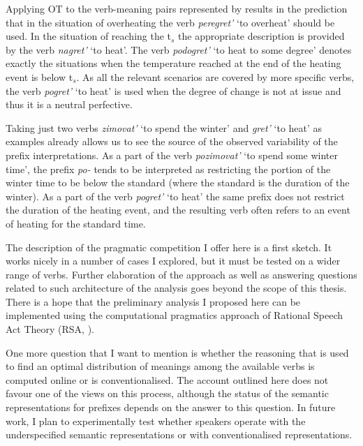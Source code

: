 Applying OT to the verb-meaning pairs represented by  results in the prediction that in the situation of overheating the verb \textit{peregret'} `to overheat' should be used. In the situation of reaching the t$_s$ the appropriate description is provided by the verb \textit{nagret'} `to heat'. The verb \textit{podogret'} `to heat to some degree' denotes exactly the situations when the temperature reached at the end of the heating event is below t$_s$. As all the relevant scenarios are covered by more specific verbs, the verb \textit{pogret'} `to heat' is used when the degree of change is not at issue and thus it is a neutral perfective.

Taking just two verbs \textit{zimovat'} `to spend the winter' and \textit{gret'} `to heat' as examples already allows us to see the source of the observed variability of the prefix interpretations. As a part of the verb \textit{pozimovat'} `to spend some winter time', the prefix \textit{po-} tends to be interpreted as restricting the portion of the winter time to be below the standard (where the standard is the duration of the winter). As a part of the verb \textit{pogret'} `to heat' the same prefix does not restrict the duration of the heating event, and the resulting verb often refers to an event of heating for the standard time. 

The description of the pragmatic competition I offer here is a first sketch. It works nicely in a number of cases I explored, but it must be tested on a wider range of verbs. Further elaboration of the approach as well as answering questions related to such architecture of the analysis goes beyond the scope of this thesis. There is a hope that the preliminary analysis I proposed here can be implemented using the computational pragmatics approach of Rational Speech Act Theory (RSA, \citealt{Franke:09, FrankGoodman:12, GoodmanStuhlmuller:13, FrankeJager:15, GoodmanFrank:16}). 

One more question that I want to mention is whether the reasoning that is used to find an optimal distribution of meanings among the available verbs is computed online or is conventionalised. The account outlined here does not favour one of the views on this process, although the status of the semantic representations for prefixes depends on the answer to this question. In future work, I plan to experimentally test whether speakers operate with the underspecified semantic representations or with conventionalised representations. 

